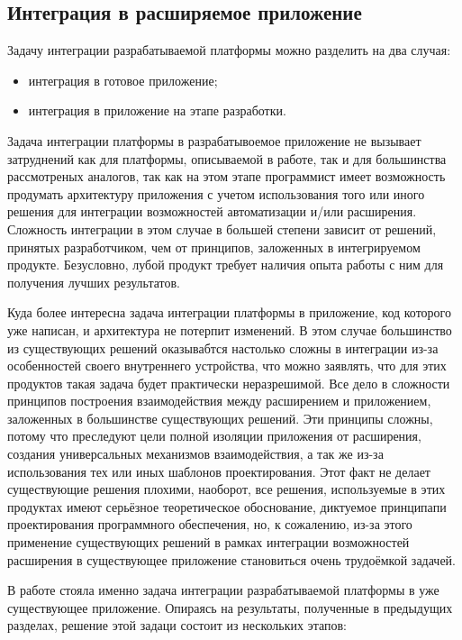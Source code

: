 \subsection{Интеграция в расширяемое приложение}
\label{sec:app-integration}

Задачу интеграции разрабатываемой платформы можно разделить на два случая:

\begin{itemize}
  \item интеграция в готовое приложение;
  \item интеграция в приложение на этапе разработки.
\end{itemize}

Задача интеграции платформы в разрабатывоемое приложение не вызывает затруднений как для платформы, описываемой в работе, так и для большинства рассмотреных аналогов, так как на этом этапе программист имеет возможность продумать архитектуру приложения с учетом использования того или иного решения для интеграции возможностей автоматизации и/или расширения. Сложность интеграции в этом случае в большей степени зависит от решений, принятых разработчиком, чем от принципов, заложенных в интегрируемом продукте. Безусловно, лубой продукт требует наличия опыта работы с ним для получения лучших результатов.

Куда более интересна задача интеграции платформы в приложение, код которого уже написан, и архитектура не потерпит изменений. В этом случае большинство из существующих решений оказывабтся настолько сложны в интеграции из-за особенностей своего внутреннего устройства, что можно заявлять, что для этих продуктов такая задача будет практически неразрешимой. Все дело в сложности принципов построения взаимодействия между расширением и приложением, заложенных в большинстве существующих решений. Эти принципы сложны, потому что преследуют цели полной изоляции приложения от расширения, создания универсальных механизмов взаимодействия, а так же из-за использования тех или иных шаблонов проектирования. Этот факт не делает существующие решения плохими, наоборот, все решения, используемые в этих продуктах имеют серьёзное теоретическое обоснование, диктуемое принципапи проектирования программного обеспечения, но, к сожалению, из-за этого применение существующих решений в рамках интеграции возможностей расширения в существующее приложение становиться очень трудоёмкой задачей.

В работе стояла именно задача интеграции разрабатываемой платформы в уже существующее приложение. Опираясь на результаты, полученные в предыдущих разделах, решение этой задаци состоит из нескольких этапов:

